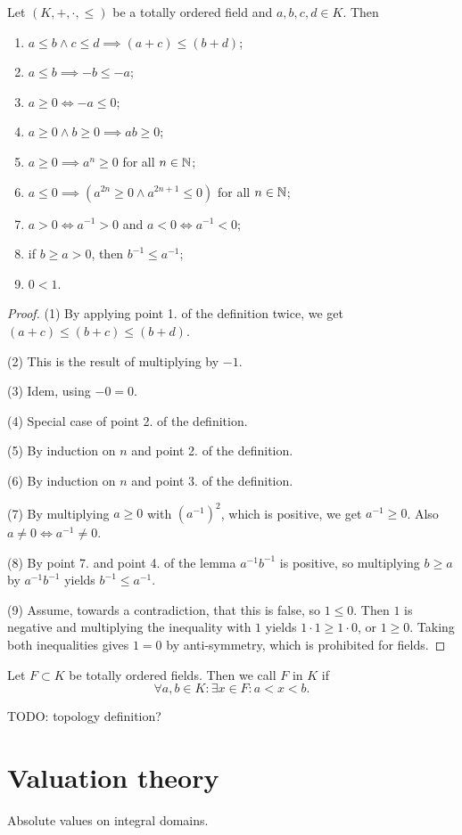 \begin{lemma}
Let $(K,+,\cdot,\leq)$ be a totally ordered field and $a,b,c,d\in K$. Then
\begin{enumerate}
\item $a\leq b \land c\leq d \implies (a+c) \leq (b+d)$;
\item $a\leq b \implies -b\leq -a$;
\item $a\geq 0 \iff -a\leq 0$;
\item $a\geq 0 \land b\geq 0 \implies ab \geq 0$;
\item $a\geq 0 \implies a^n \geq 0$ for all $n\in\mathbb{N}$;
\item $a\leq 0 \implies (a^{2n} \geq 0 \land a^{2n+1}\leq 0)$ for all $n\in\mathbb{N}$;
\item $a > 0 \iff a^{-1} > 0$ and $a < 0 \iff a^{-1} < 0$;
\item if $b \geq a>0$, then $b^{-1} \leq a^{-1}$;
\item $0<1$.
\end{enumerate}
\end{lemma}
\begin{proof}
(1) By applying point 1. of the definition twice, we get $(a+c)\leq(b+c)\leq(b+d)$.

(2) This is the result of multiplying by $-1$.

(3) Idem, using $-0=0$.

(4) Special case of point 2. of the definition.

(5) By induction on $n$ and point 2. of the definition.

(6) By induction on $n$ and point 3. of the definition.

(7) By multiplying $a \geq 0$ with $(a^{-1})^{2}$, which is positive, we get $a^{-1}\geq 0$. Also $a\neq 0 \iff a^{-1}\neq 0$.

(8) By point 7. and point 4. of the lemma $a^{-1}b^{-1}$ is positive, so multiplying $b\geq a$ by $a^{-1}b^{-1}$ yields $b^{-1} \leq a^{-1}$.

(9) Assume, towards a contradiction, that this is false, so $1\leq 0$. Then $1$ is negative and multiplying the inequality with $1$ yields $1\cdot 1 \geq 1\cdot 0$, or $1\geq 0$. Taking both inequalities gives $1=0$ by anti-symmetry, which is prohibited for fields.
\end{proof}

\begin{definition}
Let $F\subset K$ be totally ordered fields. Then we call $F$  in $K$ if
\[ \forall a,b\in K: \exists x\in F: a<x<b. \]
\end{definition}
TODO: topology definition?

\chapter{Valuation theory}
Absolute values on integral domains.